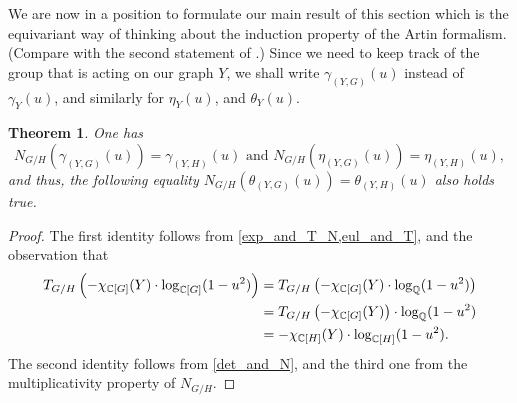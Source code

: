 \documentclass[11pt]{amsart}
\newtheorem{theorem}{Theorem}[section]
\numberwithin{equation}{section}
\theoremstyle{remark}
\theoremstyle{definition}
\begin{document}
We are now in a position to formulate our main result of this section which is the equivariant way of thinking about the induction property of the Artin formalism.  (Compare with the second statement of \cite[Proposition 1.8 on page 87]{Tate:1984}.)  Since we need to keep track of the group that is acting on our graph $Y$, we shall write $\gamma_{(Y,G)}(u)$ instead of $\gamma_{Y}(u)$, and similarly for $\eta_{Y}(u)$, and $\theta_{Y}(u)$.
\begin{theorem} \label{ind_really}
One has
$$N_{G/H}(\gamma_{(Y,G)}(u)) = \gamma_{(Y,H)}(u) \text{ and } N_{G/H}(\eta_{(Y,G)}(u)) = \eta_{(Y,H)}(u), $$
and thus, the following equality $N_{G/H}(\theta_{(Y,G)}(u)) = \theta_{(Y,H)}(u)$ also holds true.
\end{theorem}
\begin{proof}
The first identity follows from \cref{exp_and_T_N,eul_and_T}, and the observation that
\begin{equation*}
\begin{aligned} 
T_{G/H}\left(-\chi_{\mathbb{C}[G]}(Y) \cdot {\rm log}_{\mathbb{C}[G]}(1-u^{2}) \right) &= T_{G/H}\left(-\chi_{\mathbb{C}[G]}(Y) \cdot {\rm log}_{\mathbb{Q}}(1-u^{2})\right)\\ 
&= T_{G/H}\left(-\chi_{\mathbb{C}[G]}(Y)\right) \cdot {\rm log}_{\mathbb{Q}}(1-u^{2}) \\
&= -\chi_{\mathbb{C}[H]}(Y) \cdot{\rm log}_{\mathbb{C}[H]}(1-u^{2}).
\end{aligned}
\end{equation*}
The second identity follows from \cref{det_and_N}, and the third one from the multiplicativity property of $N_{G/H}$.
\end{proof}
\end{document}
